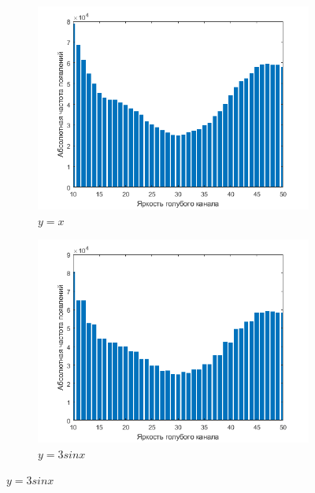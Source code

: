 \begin{figure}
     \centering
     \begin{subfigure}[b]{0.5\textwidth}
         \centering
         \includegraphics[width=\textwidth]{include/graphics/im_3_before_lsb_subst}
         \caption{$y=x$}
         \label{fig:y equals x}
     \end{subfigure}
     \hfill
     \begin{subfigure}[b]{0.5\textwidth}
         \centering
         \includegraphics[width=\textwidth]{include/graphics/im_4_after_lsb_subst}
         \caption{$y=3sinx$}
         \label{fig:three sin x}
     \end{subfigure}
\end{figure}

